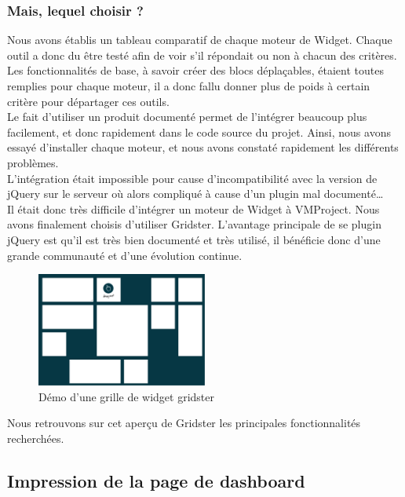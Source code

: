 \documentclass[12pt]{report}
\begin{document}
	\subsubsection{Mais, lequel choisir ?}
	
	Nous avons établis un tableau comparatif de chaque moteur de Widget. Chaque outil a donc du être testé afin de voir s’il répondait ou non à chacun des critères. Les fonctionnalités de base, à savoir créer des blocs déplaçables, étaient toutes remplies pour chaque moteur, il a donc fallu donner plus de poids à certain critère pour départager ces outils. \\

Le fait d’utiliser un produit documenté permet de l’intégrer beaucoup plus facilement, et donc rapidement dans le code source du projet. Ainsi, nous avons essayé d’installer chaque moteur, et nous avons constaté rapidement les différents problèmes.\\
L’intégration était impossible pour cause d’incompatibilité avec la version de jQuery sur le serveur où alors compliqué à cause d’un plugin mal documenté…\\

Il était donc très difficile d’intégrer un moteur de Widget à VMProject. Nous avons finalement choisis d’utiliser Gridster. L’avantage principale de se plugin jQuery est qu’il est très bien documenté et très utilisé, il bénéficie donc d’une grande communauté et d’une évolution continue.\\
	
	\begin{figure}[H]
	\centering
	\includegraphics[width=0.5\textwidth]{pictures/matthieu/m_gridster.png}
	\caption{Démo d'une grille de widget gridster}
	\label{w1}
\end{figure}

Nous retrouvons sur cet aperçu de Gridster les principales fonctionnalités recherchées.

\subsection{Impression de la page de dashboard}
\end{document}
